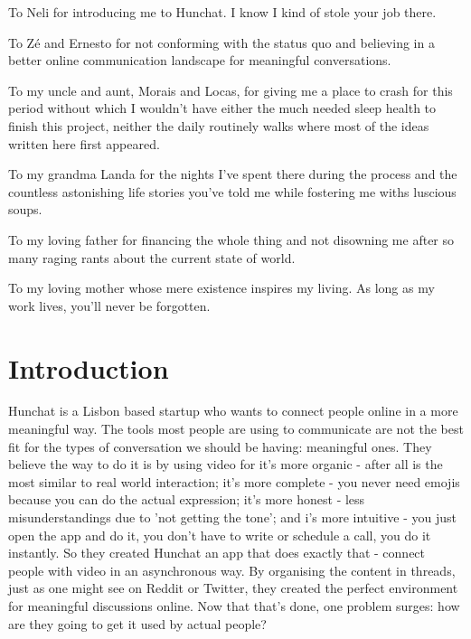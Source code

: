 \documentclass[12pt]{article}
\begin{document}
To Neli for introducing me to Hunchat. I know I kind of stole your job there.

To Zé and Ernesto for not conforming with the status quo and believing in a better online communication landscape for meaningful conversations.

To my uncle and aunt, Morais and Locas, for giving me a place to crash for this period without which I wouldn't have either the much needed sleep health to finish this project, neither the daily routinely walks where most of the ideas written here first appeared.

To my grandma Landa for the nights I've spent there during the process and the countless astonishing life stories you've told me while fostering me withs luscious soups.

To my loving father for financing the whole thing and not disowning me after so many raging rants about the current state of world.

To my loving mother whose mere existence inspires my living. As long as my work lives, you'll never be forgotten.
\cleardoublepage

\thispagestyle{empty}



\tableofcontents
\cleardoublepage 
\listoffigures
\listoftables 
\thispagestyle{empty}
\cleardoublepage 
\setcounter{page}{1}
 
\section{Introduction}\label{intro}

Hunchat is a Lisbon based startup who wants to connect people online in a more meaningful way. The tools most people are using to communicate are not the best fit for the types of conversation we should be having: meaningful ones. They believe the way to do it is by using video for it's more organic - after all is the most similar to real world interaction; it's more complete - you never need emojis because you can do the actual expression; it's more honest - less misunderstandings due to 'not getting the tone'; and i's more intuitive - you just open the app and do it, you don't have to write or schedule a call, you do it instantly. So they created Hunchat an app that does exactly that - connect people with video in an asynchronous way. By organising the content in threads, just as one might see on Reddit or Twitter, they created the perfect environment for meaningful discussions online. Now that that's done, one problem surges: how are they going to get it used by actual people?
\end{document}
